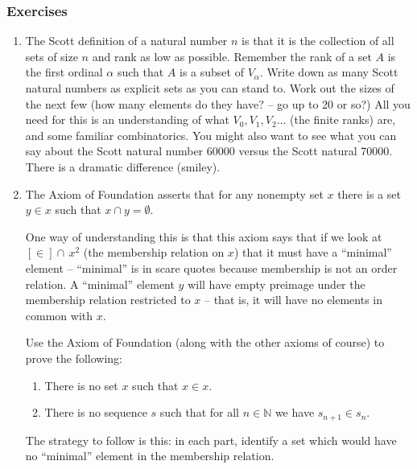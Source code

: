 \documentclass[12pt]{book}
\begin{document}
\newpage

\subsubsection{Exercises}

\begin{enumerate}

\item  
The Scott definition of a natural number $n$ 
is that it is the collection of all sets of size $n$ and rank as low
as possible.  Remember the rank of a set $A$ is the first ordinal
$\alpha$ such that $A$ is a subset of $V_{\alpha}$.  Write down as
many Scott natural numbers as explicit sets as you can stand to.  Work
out the sizes of the next few (how many elements do they have? -- go
up to 20 or so?)  All you need for this is an understanding of what
$V_0, V_1, V_2\ldots$ (the finite ranks) are, and some familiar
combinatorics.  You might also want to see what you can say about the
Scott natural number 60000 versus the Scott natural 70000.  
There is a dramatic difference (smiley).



\item  The Axiom of Foundation asserts that for any nonempty set $x$
there is a set $y \in x$ such that $x \cap y = \emptyset$.

One way of understanding this is that this axiom says that if we look
at $[\in] \cap\, x^2$ (the membership relation on $x$) that it must have
a ``minimal'' element -- ``minimal'' is in scare quotes because
membership is not an order relation.  A ``minimal'' element $y$ will
have empty preimage under the membership relation restricted to $x$ --
that is, it will have no elements in common with $x$.

Use the Axiom of Foundation (along with the other axioms of course) to prove
the following:

\begin{enumerate}

\item There is no set $x$ such that $x \in x$.

\item There is no sequence $s$ such that for all $n \in {\mathbb N}$ we have
$s_{n+1} \in s_n$.

\end{enumerate}

The strategy to follow is this: in each part, identify a set which
would have no ``minimal'' element in the membership relation.


\end{enumerate}
\end{document}
